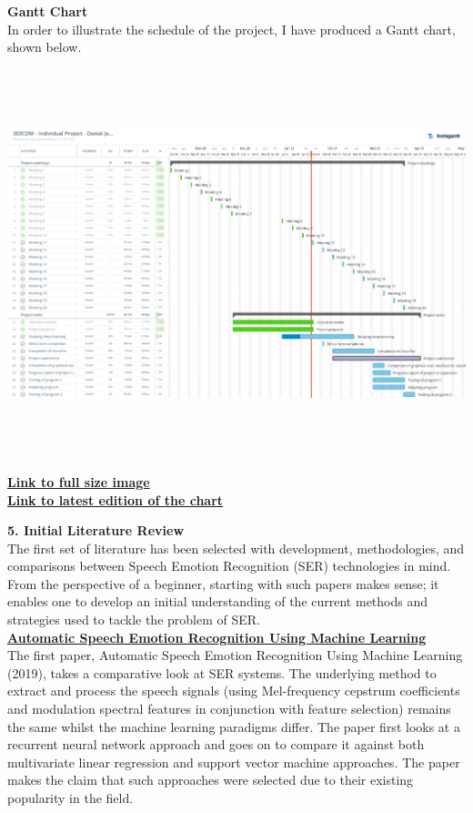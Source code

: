 \documentclass[12pt]{article}
\begin{document}
\newpage

\noindent \textbf{Gantt Chart}
\\
\noindent In order to illustrate the schedule of the project, I have produced a Gantt chart, shown below.
\\
\includegraphics[width=18cm, height=12cm]{Daniel_Jones_Gantt_Chart}
\\
\noindent \href{https://i.imgur.com/9tchO4N.jpg}{\color{blue}\textbf{Link to full size image}}
\\
\noindent \href{https://app.instagantt.com/shared/s/PdaKZZeApqszVu1eftjC/latest}{\color{blue}\textbf{Link to latest edition of the chart}}
\\
\pagebreak

\noindent \textbf{5. Initial Literature Review}
\\
The first set of literature has been selected with development, methodologies, and comparisons between Speech Emotion Recognition (SER) technologies in mind. From the perspective of a beginner, starting with such papers makes sense; it enables one to develop an initial understanding of the current methods and strategies used to tackle the problem of SER.
\\

\noindent \href{https://www.intechopen.com/books/social-media-and-machine-learning/automatic-speech-emotion-recognition-using-machine-learning}{\textbf{Automatic Speech Emotion Recognition Using Machine Learning}}
\\
The first paper, Automatic Speech Emotion Recognition Using Machine Learning (2019), takes a comparative look at SER systems. The underlying method to extract and process the speech signals (using Mel-frequency cepstrum coefficients and modulation spectral features in conjunction with feature selection) remains the same whilst the machine learning paradigms differ. The paper first looks at a recurrent neural network approach and goes on to compare it against both multivariate linear regression and support vector machine approaches. The paper makes the claim that such approaches were selected due to their existing popularity in the field. 
\\
\end{document}
